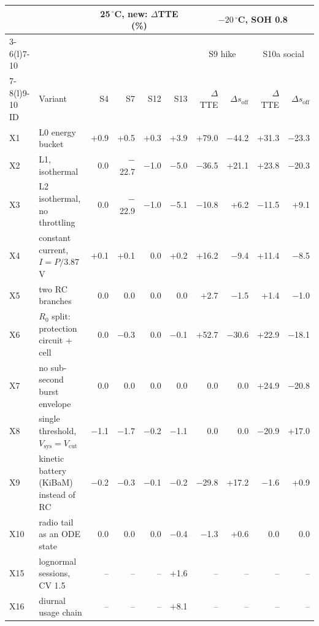 \setlength{\tabcolsep}{4pt}%
\begin{tabular}{@{}llrrrrrrrr@{}}
\toprule
 & & \multicolumn{4}{c}{25\,$^\circ$C, new: $\Delta$TTE (\%)} & \multicolumn{4}{c}{$-20\,^\circ$C, SOH 0.8} \\
\cmidrule(lr){3-6}\cmidrule(l){7-10}
 & & & & & & \multicolumn{2}{c}{S9 hike} & \multicolumn{2}{c}{S10a social} \\
\cmidrule(lr){7-8}\cmidrule(l){9-10}
ID & Variant & S4 & S7 & S12 & S13 & $\Delta$TTE & $\Delta s_\mathrm{off}$ & $\Delta$TTE & $\Delta s_\mathrm{off}$ \\
\midrule
X1 & L0 energy bucket & +0.9 & +0.5 & +0.3 & +3.9 & +79.0 & $-$44.2 & +31.3 & $-$23.3 \\
X2 & L1, isothermal & 0.0 & $-$22.7 & $-$1.0 & $-$5.0 & $-$36.5 & +21.1 & +23.8 & $-$20.3 \\
X3 & L2 isothermal, no throttling & 0.0 & $-$22.9 & $-$1.0 & $-$5.1 & $-$10.8 & +6.2 & $-$11.5 & +9.1 \\
X4 & constant current, $I=P/3.87$\,V & +0.1 & +0.1 & 0.0 & +0.2 & +16.2 & $-$9.4 & +11.4 & $-$8.5 \\
X5 & two RC branches & 0.0 & 0.0 & 0.0 & 0.0 & +2.7 & $-$1.5 & +1.4 & $-$1.0 \\
X6 & $R_0$ split: protection circuit + cell & 0.0 & $-$0.3 & 0.0 & $-$0.1 & +52.7 & $-$30.6 & +22.9 & $-$18.1 \\
X7 & no sub-second burst envelope & 0.0 & 0.0 & 0.0 & 0.0 & 0.0 & 0.0 & +24.9 & $-$20.8 \\
X8 & single threshold, $V_\mathrm{sys}=V_\mathrm{cut}$ & $-$1.1 & $-$1.7 & $-$0.2 & $-$1.1 & 0.0 & 0.0 & $-$20.9 & +17.0 \\
X9 & kinetic battery (KiBaM) instead of RC & $-$0.2 & $-$0.3 & $-$0.1 & $-$0.2 & $-$29.8 & +17.2 & $-$1.6 & +0.9 \\
X10 & radio tail as an ODE state & 0.0 & 0.0 & 0.0 & $-$0.4 & $-$1.3 & +0.6 & 0.0 & 0.0 \\
X15 & lognormal sessions, CV 1.5 & -- & -- & -- & +1.6 & -- & -- & -- & -- \\
X16 & diurnal usage chain & -- & -- & -- & +8.1 & -- & -- & -- & -- \\
\bottomrule
\end{tabular}

